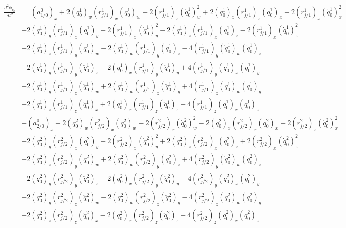 \documentclass{article}
\begin{document}
\begin{align}
    \begin{split}
        \frac{d^2\phi_{r_x}}{dt^2} &= (a_{1/0}^0)_x + 2(q_0^1)_w(r_{j/1}^1)_x(\ddot{q}_0^1)_w + 2(r_{j/1}^1)_x(\dot{q}_0^1)_w^2 + 2(q_0^1)_x(r_{j/1}^1)_x(\ddot{q}_0^1)_x + 2(r_{j/1}^1)_x(\dot{q}_0^1)_x^2 \\
                                   &- 2(q_0^1)_y(r_{j/1}^1)_x(\ddot{q}_0^1)_y - 2(r_{j/1}^1)_x(\dot{q}_0^1)_y^2 - 2(q_0^1)_z(r_{j/1}^1)_x(\ddot{q}_0^1)_z - 2(r_{j/1}^1)_x(\dot{q}_0^1)_z^2 \\
                                   &- 2(q_0^1)_z(r_{j/1}^1)_y(\ddot{q}_0^1)_w - 2(q_0^1)_w(r_{j/1}^1)_y(\ddot{q}_0^1)_z - 4(r_{j/1}^1)_y(\dot{q}_0^1)_w(\dot{q}_0^1)_z \\
                                   &+ 2(q_0^1)_y(r_{j/1}^1)_y(\ddot{q}_0^1)_x + 2(q_0^1)_x(r_{j/1}^1)_y(\ddot{q}_0^1)_y + 4(r_{j/1}^1)_y(\dot{q}_0^1)_x(\dot{q}_0^1)_y \\
                                   &+ 2(q_0^1)_y(r_{j/1}^1)_z(\ddot{q}_0^1)_w + 2(q_0^1)_w(r_{j/1}^1)_z(\ddot{q}_0^1)_y + 4(r_{j/1}^1)_z(\dot{q}_0^1)_w(\dot{q}_0^1)_y \\
                                   &+ 2(q_0^1)_z(r_{j/1}^1)_z(\ddot{q}_0^1)_x + 2(q_0^1)_x(r_{j/1}^1)_z(\ddot{q}_0^1)_z + 4(r_{j/1}^1)_z(\dot{q}_0^1)_x(\dot{q}_0^1)_z \\
                                   &- (a_{2/0}^0)_x - 2(q_0^2)_w(r_{j/2}^2)_x(\ddot{q}_0^2)_w - 2(r_{j/2}^2)_x(\dot{q}_0^2)_w^2 - 2(q_0^2)_x(r_{j/2}^2)_x(\ddot{q}_0^2)_x - 2(r_{j/2}^2)_x(\dot{q}_0^2)_x^2 \\
                                   &+ 2(q_0^2)_y(r_{j/2}^2)_x(\ddot{q}_0^2)_y + 2(r_{j/2}^2)_x(\dot{q}_0^2)_y^2 + 2(q_0^2)_z(r_{j/2}^2)_x(\ddot{q}_0^2)_z + 2(r_{j/2}^2)_x(\dot{q}_0^2)_z^2 \\
                                   &+ 2(q_0^2)_z(r_{j/2}^2)_y(\ddot{q}_0^2)_w + 2(q_0^2)_w(r_{j/2}^2)_y(\ddot{q}_0^2)_z + 4(r_{j/2}^2)_y(\dot{q}_0^2)_w(\dot{q}_0^2)_z \\
                                   &- 2(q_0^2)_y(r_{j/2}^2)_y(\ddot{q}_0^2)_x - 2(q_0^2)_x(r_{j/2}^2)_y(\ddot{q}_0^2)_y - 4(r_{j/2}^2)_y(\dot{q}_0^2)_x(\dot{q}_0^2)_y \\
                                   &- 2(q_0^2)_y(r_{j/2}^2)_z(\ddot{q}_0^2)_w - 2(q_0^2)_w(r_{j/2}^2)_z(\ddot{q}_0^2)_y - 4(r_{j/2}^2)_z(\dot{q}_0^2)_w(\dot{q}_0^2)_y \\
                                   &- 2(q_0^2)_z(r_{j/2}^2)_z(\ddot{q}_0^2)_x - 2(q_0^2)_x(r_{j/2}^2)_z(\ddot{q}_0^2)_z - 4(r_{j/2}^2)_z(\dot{q}_0^2)_x(\dot{q}_0^2)_z
    \end{split}
\end{align}
\end{document}
